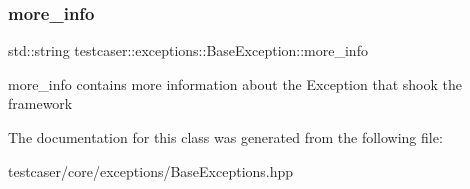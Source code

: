 \subsubsection{\texorpdfstring{more\_info}{more\_info}}
{\footnotesize\ttfamily std\+::string testcaser\+::exceptions\+::\+Base\+Exception\+::more\+\_\+info\hspace{0.3cm}{\ttfamily [protected]}}



more\+\_\+info contains more information about the Exception that shook the framework 



The documentation for this class was generated from the following file\+:\begin{DoxyCompactItemize}
\item 
testcaser/core/exceptions/Base\+Exceptions.\+hpp\end{DoxyCompactItemize}
